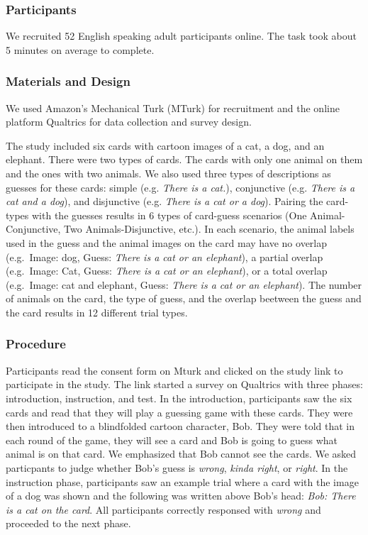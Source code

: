 \documentclass[10pt, letterpaper]{article}
\begin{document}
\subsubsection{Participants}\label{participants}

We recruited 52 English speaking adult participants online. The task
took about 5 minutes on average to complete.

\subsubsection{Materials and Design}\label{materials-and-design}

We used Amazon's Mechanical Turk (MTurk) for recruitment and the online
platform Qualtrics for data collection and survey design.

The study included six cards with cartoon images of a cat, a dog, and an
elephant. There were two types of cards. The cards with only one animal
on them and the ones with two animals. We also used three types of
descriptions as guesses for these cards: simple (e.g. \emph{There is a
cat.}), conjunctive (e.g. \emph{There is a cat and a dog}), and
disjunctive (e.g. \emph{There is a cat or a dog}). Pairing the
card-types with the guesses results in 6 types of card-guess scenarios
(One Animal-Conjunctive, Two Animals-Disjunctive, etc.). In each
scenario, the animal labels used in the guess and the animal images on
the card may have no overlap (e.g.~Image: dog, Guess: \emph{There is a
cat or an elephant}), a partial overlap (e.g.~Image: Cat, Guess:
\emph{There is a cat or an elephant}), or a total overlap (e.g.~Image:
cat and elephant, Guess: \emph{There is a cat or an elephant}). The
number of animals on the card, the type of guess, and the overlap
beetween the guess and the card results in 12 different trial types.

\subsubsection{Procedure}\label{procedure}

Participants read the consent form on Mturk and clicked on the study
link to participate in the study. The link started a survey on Qualtrics
with three phases: introduction, instruction, and test. In the
introduction, participants saw the six cards and read that they will
play a guessing game with these cards. They were then introduced to a
blindfolded cartoon character, Bob. They were told that in each round of
the game, they will see a card and Bob is going to guess what animal is
on that card. We emphasized that Bob cannot see the cards. We asked
particpants to judge whether Bob's guess is \emph{wrong}, \emph{kinda
right}, or \emph{right}. In the instruction phase, participants saw an
example trial where a card with the image of a dog was shown and the
following was written above Bob's head: \emph{Bob: There is a cat on the
card}. All participants correctly responsed with \emph{wrong} and
proceeded to the next phase.
\end{document}
